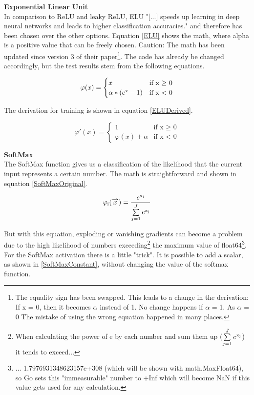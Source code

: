\documentclass[11pt]{article}
\begin{document}
\newpage
\textbf{Exponential Linear Unit}\\
In comparison to ReLU and leaky ReLU, ELU "[...] speeds up learning in deep neural networks and leads to higher classification accuracies."\cite{DBLP:journals/corr/ClevertUH15} and therefore has been chosen over the other options. Equation \eqref{ELU} shows the math, where alpha is a positive value that can be freely chosen. Caution: The math has been updated since version 3 of their paper\footnote{The equality sign has been swapped. This leads to a change in the derivation: If x = 0, then it becomes $\alpha$ instead of 1. No change happens if $\alpha$ = 1. As $\alpha$ = 0  The mistake of using the wrong equation happened in many places.}. The code has already be changed accordingly, but the test results stem from the following equations.

\begin{equation}
\label{ELU}
\varphi(x) =\begin{cases}
x & \text{if x $\geq$ 0}\\
\alpha * (e\textsuperscript{x} - 1) & \text{if x < 0}
\end{cases}
\end{equation}

The derivation for training is shown in equation \eqref{ELUDerived}.

\begin{equation}
\label{ELUDerived}
\varphi'(x) =\begin{cases}
1 & \text{if x $\geq$ 0}\\
\varphi(x) + \alpha & \text{if x < 0}
\end{cases}
\end{equation}

\textbf{SoftMax}\\
The SoftMax function gives us a classification of the likelihood that the current input represents a certain number. The math is straightforward and shown in equation \eqref{SoftMaxOriginal}.

\begin{equation}
\label{SoftMaxOriginal}
\varphi\textsubscript{i}(\overrightarrow{x}) =
\frac{e\textsuperscript{x\textsubscript{i}}}{\sum\limits_{j=1}^J e\textsuperscript{x\textsubscript{j}}}
\end{equation}

But with this equation, exploding or vanishing gradients\cite{DBLP:journals/corr/abs-1211-5063} can become a problem due to the high likelihood of numbers exceeding\footnote{When calculating the power of e by each number and sum them up ($\sum\limits_{j=1}^J e\textsuperscript{x\textsubscript{j}}$) it tends to exceed...} the maximum value of float64\footnote{... 1.7976931348623157e+308 (which will be shown with math.MaxFloat64), so Go sets this "immeasurable" number to +Inf which will become NaN if this value gets used for any calculation.}. For the SoftMax activation there is a little "trick". It is possible to add a scalar, as shown in \eqref{SoftMaxConstant}, without changing the value of the softmax function\cite{GoodfellowEtAl2016}.
\end{document}
